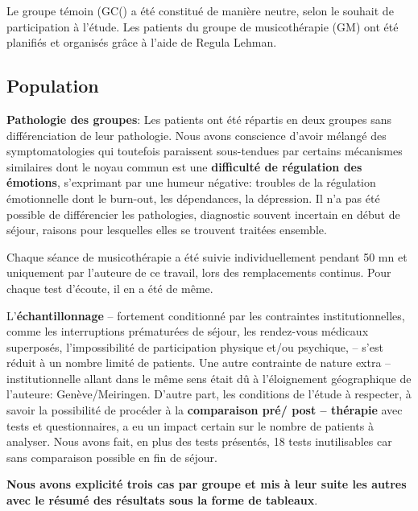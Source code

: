   Le groupe témoin (GC() a été constitué de manière neutre, selon le souhait de participation à l'étude. 
 Les patients du groupe de musicothérapie (GM) 
 ont été planifiés et organisés grâce à l'aide de Regula Lehman.
 \subsection{Population}
 
 
 \textbf{ Pathologie des groupes}: Les patients ont été répartis en deux groupes sans différenciation de
 leur pathologie. Nous avons conscience d'avoir mélangé des symptomatologies qui
 toutefois paraissent
 sous-tendues par
 certains mécanismes
 similaires dont le
 noyau commun est une
 \textbf{difficulté de
 	régulation des
 	émotions},
 s'exprimant par une
 humeur négative: 
 troubles de la régulation émotionnelle
 dont le burn-out, les dépendances, la dépression.
 Il n'a pas été
 possible de différencier les pathologies, 
 diagnostic souvent incertain en début de séjour, raisons pour lesquelles elles
 se trouvent traitées ensemble.
 

 Chaque séance de musicothérapie a été suivie individuellement pendant 50 mn et uniquement par 
 l'auteure de ce 
 travail, lors des remplacements continus. Pour chaque test d'écoute, il en a été de même.
 
 
 
 L'\textbf{échantillonnage} -- fortement conditionné par les contraintes
 institutionnelles, comme les interruptions prématurées de séjour, les rendez-vous
 médicaux superposés, l'impossibilité de participation physique et/ou
 psychique,
 -- s'est réduit à un nombre limité de
 patients.
 Une autre contrainte de nature extra -- institutionnelle allant dans le
 même sens était dû à l'éloignement géographique de l'auteure: Genève/Meiringen.
 D'autre part, les conditions de l'étude à respecter, 
 à savoir la possibilité de procéder à la \textbf{ comparaison pré/ post -- thérapie} avec tests et 
 questionnaires, a eu un impact 
 certain sur le nombre de patients à analyser. 
 Nous avons fait, en plus des tests présentés, 18  tests  
 inutilisables car sans comparaison possible en fin de séjour.
 

 
  \textbf{Nous avons explicité trois cas par groupe  et mis à leur suite les autres avec le résumé des 
 résultats 
 sous la forme de tableaux}.
 
